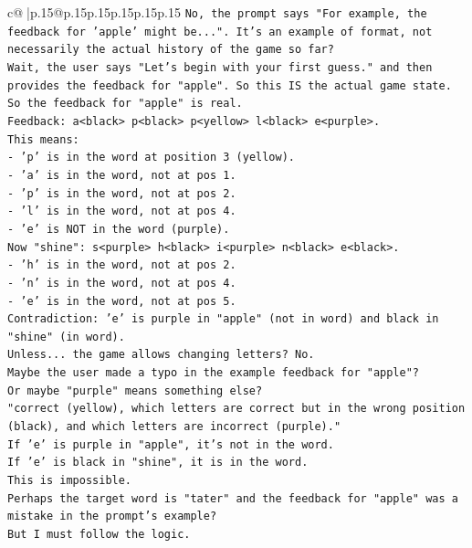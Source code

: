 \documentclass{article}
\begin{document}
{\begin{supertabular}{c@{$\;$}|p{.15\linewidth}@{}p{.15\linewidth}p{.15\linewidth}p{.15\linewidth}p{.15\linewidth}p{.15\linewidth}}
{{{\texttt{No, the prompt says "For example, the feedback for 'apple' might be...". It's an example of format, not necessarily the actual history of the game so far?} \\
\texttt{Wait, the user says "Let's begin with your first guess." and then provides the feedback for "apple". So this IS the actual game state.} \\
\texttt{So the feedback for "apple" is real.} \\
\texttt{Feedback: a<black> p<black> p<yellow> l<black> e<purple>.} \\
\texttt{This means:} \\
\texttt{{-} 'p' is in the word at position 3 (yellow).} \\
\texttt{{-} 'a' is in the word, not at pos 1.} \\
\texttt{{-} 'p' is in the word, not at pos 2.} \\
\texttt{{-} 'l' is in the word, not at pos 4.} \\
\texttt{{-} 'e' is NOT in the word (purple).} \\
\texttt{Now "shine": s<purple> h<black> i<purple> n<black> e<black>.} \\
\texttt{{-} 'h' is in the word, not at pos 2.} \\
\texttt{{-} 'n' is in the word, not at pos 4.} \\
\texttt{{-} 'e' is in the word, not at pos 5.} \\
\texttt{Contradiction: 'e' is purple in "apple" (not in word) and black in "shine" (in word).} \\
\texttt{Unless... the game allows changing letters? No.} \\
\texttt{Maybe the user made a typo in the example feedback for "apple"?} \\
\texttt{Or maybe "purple" means something else?} \\
\texttt{"correct (yellow), which letters are correct but in the wrong position (black), and which letters are incorrect (purple)."} \\
\texttt{If 'e' is purple in "apple", it's not in the word.} \\
\texttt{If 'e' is black in "shine", it is in the word.} \\
\texttt{This is impossible.} \\
\texttt{Perhaps the target word is "tater" and the feedback for "apple" was a mistake in the prompt's example?} \\
\texttt{But I must follow the logic.} \\
}}}
\end{supertabular}}
\end{document}

